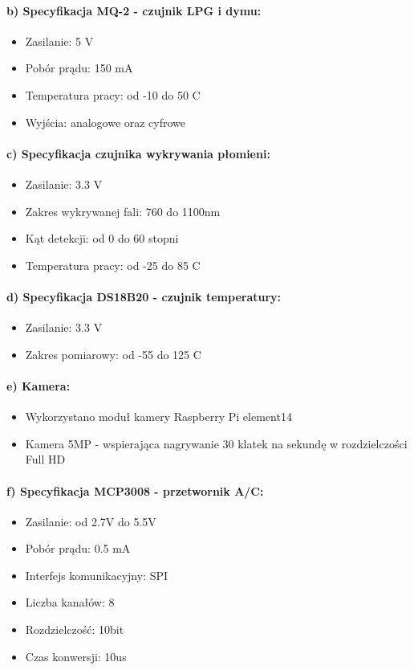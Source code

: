 \paragraph{b) Specyfikacja MQ-2 - czujnik LPG i dymu:}
\begin{itemize} 
\item Zasilanie: 5 V
\item Pobór prądu: 150 mA
\item Temperatura pracy: od -10 do 50 \textdegree{}C
\item Wyjścia: analogowe oraz cyfrowe
\end{itemize}

\paragraph{c) Specyfikacja czujnika wykrywania płomieni:}
\begin{itemize} 
\item Zasilanie: 3.3 V
\item Zakres wykrywanej fali: 760 do 1100nm
\item Kąt detekcji: od 0 do 60 stopni
\item Temperatura pracy: od -25 do 85 \textdegree{}C
\end{itemize}

\paragraph{d) Specyfikacja DS18B20 - czujnik temperatury:}
\begin{itemize} 
\item Zasilanie: 3.3 V
\item Zakres pomiarowy: od -55 do 125 \textdegree{}C
\end{itemize}

\paragraph{e) Kamera:}
\begin{itemize} 
\item Wykorzystano moduł kamery Raspberry Pi element14
\item Kamera 5MP - wspierająca nagrywanie 30 klatek na sekundę w rozdzielczości Full HD
\end{itemize}

\paragraph{f) Specyfikacja MCP3008 - przetwornik A/C:}
\begin{itemize} 
\item Zasilanie: od 2.7V do 5.5V
\item Pobór prądu: 0.5 mA
\item Interfejs komunikacyjny: SPI
\item Liczba kanałów: 8
\item Rozdzielczość: 10bit
\item Czas konwersji: 10us
\end{itemize}


